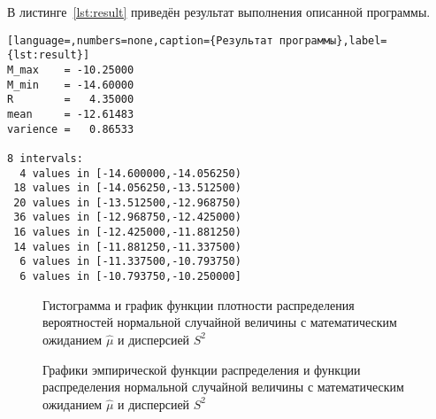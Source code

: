 В листинге~\ref{lst:result} приведён результат выполнения описанной программы.
\begin{lstlisting}[language=,numbers=none,caption={Результат программы},label={lst:result}]
M_max    = -10.25000
M_min    = -14.60000
R        =   4.35000
mean     = -12.61483
varience =   0.86533

8 intervals:
  4 values in [-14.600000,-14.056250)
 18 values in [-14.056250,-13.512500)
 20 values in [-13.512500,-12.968750)
 36 values in [-12.968750,-12.425000)
 16 values in [-12.425000,-11.881250)
 14 values in [-11.881250,-11.337500)
  6 values in [-11.337500,-10.793750)
  6 values in [-10.793750,-10.250000]
\end{lstlisting}

\begin{figure}[H]
    \caption{Гистограмма и график функции плотности распределения вероятностей нормальной случайной величины с математическим ожиданием $\hat \mu$ и дисперсией $S^2$}\label{img:plot01}

    
\end{figure}

\begin{figure}[H]
    \caption{Графики эмпирической функции распределения и функции распределения нормальной случайной величины с математическим ожиданием $\hat \mu$ и дисперсией $S^2$}\label{img:plot02}
    
\end{figure}

